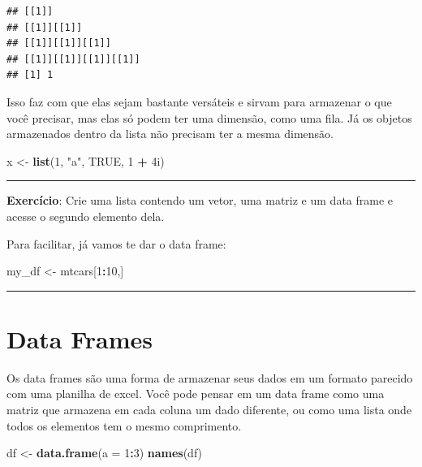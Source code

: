 \documentclass[]{book}
\newenvironment{Shaded}{\begin{snugshade}}{\end{snugshade}}
\newcommand{\KeywordTok}[1]{\textcolor[rgb]{0.13,0.29,0.53}{\textbf{#1}}}
\newcommand{\DataTypeTok}[1]{\textcolor[rgb]{0.13,0.29,0.53}{#1}}
\newcommand{\DecValTok}[1]{\textcolor[rgb]{0.00,0.00,0.81}{#1}}
\newcommand{\StringTok}[1]{\textcolor[rgb]{0.31,0.60,0.02}{#1}}
\newcommand{\OtherTok}[1]{\textcolor[rgb]{0.56,0.35,0.01}{#1}}
\newcommand{\OperatorTok}[1]{\textcolor[rgb]{0.81,0.36,0.00}{\textbf{#1}}}
\newcommand{\NormalTok}[1]{#1}
\theoremstyle{definition}
\theoremstyle{definition}
\theoremstyle{definition}
\theoremstyle{remark}
\begin{document}
\begin{verbatim}
## [[1]]
## [[1]][[1]]
## [[1]][[1]][[1]]
## [[1]][[1]][[1]][[1]]
## [1] 1
\end{verbatim}

Isso faz com que elas sejam bastante versáteis e sirvam para armazenar o
que você precisar, mas elas só podem ter uma dimensão, como uma fila. Já
os objetos armazenados dentro da lista não precisam ter a mesma
dimensão.

\begin{Shaded}
\begin{Highlighting}[]
\NormalTok{x <-}\StringTok{ }\KeywordTok{list}\NormalTok{(}\DecValTok{1}\NormalTok{, }\StringTok{"a"}\NormalTok{, }\OtherTok{TRUE}\NormalTok{, }\DecValTok{1} \OperatorTok{+}\StringTok{ }\NormalTok{4i)}
\end{Highlighting}
\end{Shaded}

\begin{center}\rule{0.5\linewidth}{\linethickness}\end{center}

{\textbf{Exercício}: Crie uma lista contendo um vetor, uma matriz e um
data frame e acesse o segundo elemento dela.}

{Para facilitar, já vamos te dar o data frame:}

\begin{Shaded}
\begin{Highlighting}[]
\NormalTok{my_df <-}\StringTok{ }\NormalTok{mtcars[}\DecValTok{1}\OperatorTok{:}\DecValTok{10}\NormalTok{,]}
\end{Highlighting}
\end{Shaded}

\begin{center}\rule{0.5\linewidth}{\linethickness}\end{center}

\hypertarget{dataframes}{\section{Data Frames}\label{dataframes}}

Os data frames são uma forma de armazenar seus dados em um formato
parecido com uma planilha de excel. Você pode pensar em um data frame
como uma matriz que armazena em cada coluna um dado diferente, ou como
uma lista onde todos os elementos tem o mesmo comprimento.

\begin{Shaded}
\begin{Highlighting}[]
\NormalTok{df <-}\StringTok{ }\KeywordTok{data.frame}\NormalTok{(}\DataTypeTok{a =} \DecValTok{1}\OperatorTok{:}\DecValTok{3}\NormalTok{)}
\KeywordTok{names}\NormalTok{(df)}
\end{Highlighting}
\end{Shaded}
\end{document}
